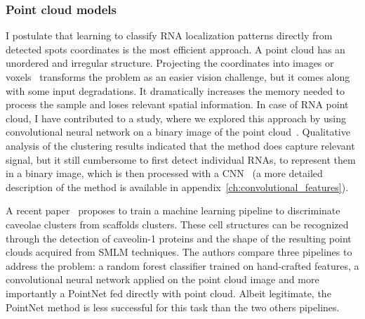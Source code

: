 
\subsubsection{Point cloud models}

I postulate that learning to classify RNA localization patterns directly from detected spots coordinates is the most efficient approach.
A point cloud has an unordered and irregular structure.
Projecting the coordinates into images or voxels~\cite{Maturana_2015} transforms the problem as an easier vision challenge, but it comes along with some input degradations.
It dramatically increases the memory needed to process the sample and loses relevant spatial information.
In case of \ac{RNA} point cloud, I have contributed to a study, where we explored this approach by using convolutional neural network on a binary image of the point cloud~\cite{dubois_deep_2019}.
Qualitative analysis of the clustering results indicated that the method does capture relevant signal, but it still cumbersome to first detect individual \ac{RNA}s, to represent them in a binary image, which is then processed with a CNN~\cite{dubois_deep_2019} (a more detailed description of the method is available in appendix~\ref{ch:convolutional_features}).

A recent paper~\cite{khater_caveolae_2019} proposes to train a machine learning pipeline to discriminate caveolae clusters from scaffolds clusters.
These cell structures can be recognized through the detection of caveolin-1 proteins and the shape of the resulting point clouds acquired from \ac{SMLM} techniques.
The authors compare three pipelines to address the problem: a random forest classifier trained on hand-crafted features, a convolutional neural network applied on the point cloud image and more importantly a PointNet fed directly with point cloud.
Albeit legitimate, the PointNet method is less successful for this task than the two others pipelines.

